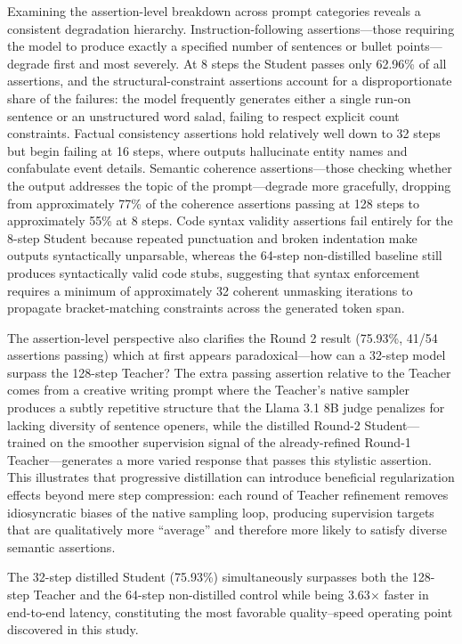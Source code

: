 \documentclass[11pt, a4paper]{article}
\begin{document}
Examining the assertion-level breakdown across prompt categories reveals a consistent degradation hierarchy. Instruction-following assertions---those requiring the model to produce exactly a specified number of sentences or bullet points---degrade first and most severely. At 8 steps the Student passes only 62.96\% of all assertions, and the structural-constraint assertions account for a disproportionate share of the failures: the model frequently generates either a single run-on sentence or an unstructured word salad, failing to respect explicit count constraints. Factual consistency assertions hold relatively well down to 32 steps but begin failing at 16 steps, where outputs hallucinate entity names and confabulate event details. Semantic coherence assertions---those checking whether the output addresses the topic of the prompt---degrade more gracefully, dropping from approximately 77\% of the coherence assertions passing at 128 steps to approximately 55\% at 8 steps. Code syntax validity assertions fail entirely for the 8-step Student because repeated punctuation and broken indentation make outputs syntactically unparsable, whereas the 64-step non-distilled baseline still produces syntactically valid code stubs, suggesting that syntax enforcement requires a minimum of approximately 32 coherent unmasking iterations to propagate bracket-matching constraints across the generated token span.

The assertion-level perspective also clarifies the Round 2 result (75.93\%, 41/54 assertions passing) which at first appears paradoxical---how can a 32-step model surpass the 128-step Teacher? The extra passing assertion relative to the Teacher comes from a creative writing prompt where the Teacher's native sampler produces a subtly repetitive structure that the Llama 3.1 8B judge penalizes for lacking diversity of sentence openers, while the distilled Round-2 Student---trained on the smoother supervision signal of the already-refined Round-1 Teacher---generates a more varied response that passes this stylistic assertion. This illustrates that progressive distillation can introduce beneficial regularization effects beyond mere step compression: each round of Teacher refinement removes idiosyncratic biases of the native sampling loop, producing supervision targets that are qualitatively more ``average'' and therefore more likely to satisfy diverse semantic assertions.

The 32-step distilled Student (75.93\%) simultaneously surpasses both the 128-step Teacher and the 64-step non-distilled control while being 3.63$\times$ faster in end-to-end latency, constituting the most favorable quality--speed operating point discovered in this study.
\end{document}

